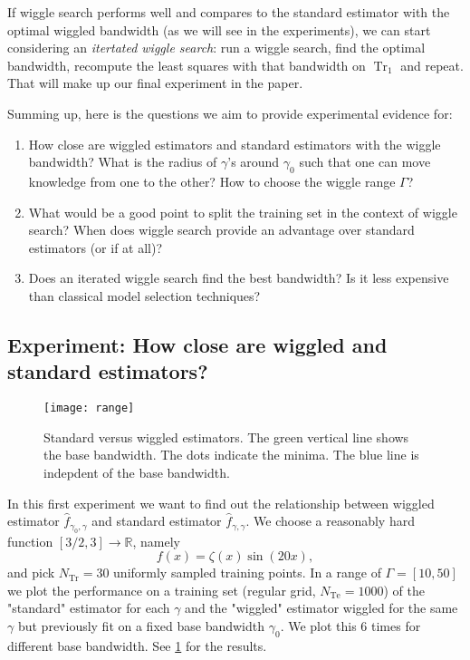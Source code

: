 \documentclass[12pt]{amsart}
\newcommand{\R}{\mathbb{R}}
\DeclareMathOperator{\Tr}{Tr}
\DeclareMathOperator{\Te}{Te}
\begin{document}
If wiggle search performs well and compares to the standard estimator 
with the optimal wiggled bandwidth (as we will see in the experiments), 
we can start considering an \emph{itertated wiggle search}:
run a wiggle search, find the optimal bandwidth, recompute the 
least squares with that bandwidth on $\Tr_1$ and repeat.
That will make up our final experiment in the paper.

Summing up, here is the questions we aim to provide experimental 
evidence for:
\begin{enumerate}
    \item How close are wiggled estimators and standard estimators with 
        the wiggle bandwidth? 
        What is the radius of $\gamma$'s around $\gamma_0$ such that one 
        can move knowledge from one to the other? 
        How to choose the wiggle range $\Gamma$?
    \item What would be a good point to split the training set in the 
        context of wiggle search?
        When does wiggle search provide an advantage over standard 
        estimators (or if at all)?
    \item Does an iterated wiggle search find the best bandwidth?
        Is it less expensive than classical model selection techniques?
\end{enumerate}

\subsection{Experiment: How close are wiggled and standard estimators?}

\begin{figure}[htp]
    \centering
    \texttt{[image: range]}
    \caption{
        Standard versus wiggled estimators. 
        The green vertical line shows the base bandwidth.
        The dots indicate the minima.
        The blue line is indepdent of the base bandwidth. }
    \label{fig:range}
\end{figure}

In this first experiment we want to find out the relationship between wiggled
estimator $\hat f_{\gamma_0,\gamma}$ and standard estimator 
$\hat f_{\gamma,\gamma}$.
We choose a reasonably hard function $[3/2, 3] \to \R$, namely
\[ f(x) = \zeta(x) \sin(20 x), \]
and pick $N_{\Tr} = 30$ uniformly sampled training points.
In a range of $\Gamma = [10,50]$ we plot the performance on 
a training set (regular grid, $N_{\Te} = 1000$) of the "standard" estimator
for each $\gamma$ and the "wiggled" estimator wiggled for the same 
$\gamma$ but previously fit on a fixed base bandwidth $\gamma_0$.
We plot this 6 times for different base bandwidth.
See \cref{fig:range} for the results.
\end{document}
